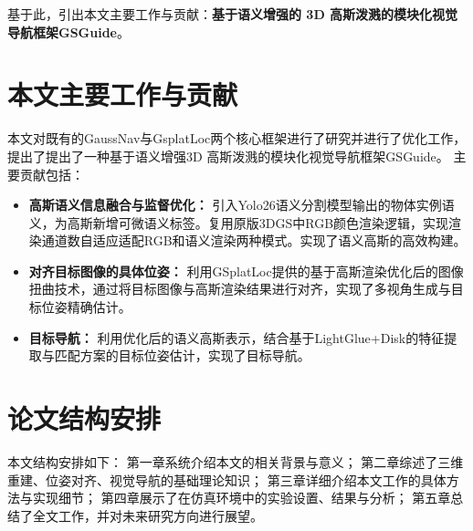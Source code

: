基于此，引出本文主要工作与贡献：\textbf{基于语义增强的 3D 高斯泼溅的模块化视觉导航框架GSGuide}。



\section{本文主要工作与贡献}
本文对既有的GaussNav\cite{gaussnav}与GsplatLoc\cite{gsplatloc}两个核心框架进行了研究并进行了优化工作，提出了提出了一种基于语义增强3D 高斯泼溅的模块化视觉导航框架GSGuide。
主要贡献包括：

\begin{itemize}    
    \item \textbf{高斯语义信息融合与监督优化：} 引入Yolo26\cite{Yolo26}语义分割模型输出的物体实例语义，为高斯新增可微语义标签。复用原版3DGS中RGB颜色渲染逻辑，实现渲染通道数自适应适配RGB和语义渲染两种模式。实现了语义高斯的高效构建。
    \item \textbf{对齐目标图像的具体位姿：} 利用GSplatLoc\cite{gsplatloc}提供的基于高斯渲染优化后的图像扭曲技术，通过将目标图像与高斯渲染结果进行对齐，实现了多视角生成与目标位姿精确估计。
    \item \textbf{目标导航：} 利用优化后的语义高斯表示，结合基于LightGlue+Disk\cite{lightglue,disk}的特征提取与匹配方案的目标位姿估计，实现了目标导航。
\end{itemize}

\section{论文结构安排}
本文结构安排如下：
第一章系统介绍本文的相关背景与意义；
第二章综述了三维重建、位姿对齐、视觉导航的基础理论知识；
第三章详细介绍本文工作的具体方法与实现细节；
第四章展示了在仿真环境中的实验设置、结果与分析；
第五章总结了全文工作，并对未来研究方向进行展望。